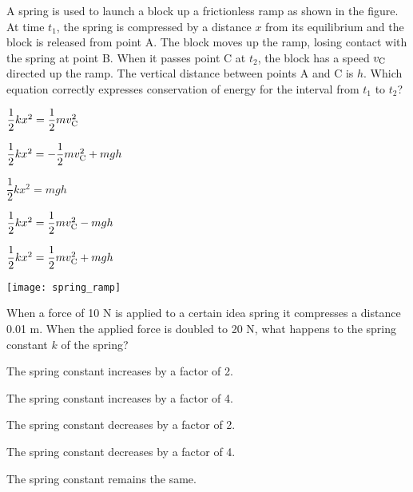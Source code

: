 \documentclass[11pt]{article}
\begin{document}
\begin{enumerate}
\begin{minipage}[t]{.6\lw}
\item A spring is used to launch a block up a frictionless ramp as shown in the figure. At time $t_1$, the spring is compressed by a distance $x$ from its equilibrium and the block is released from point A. The block moves up the ramp, losing contact with the spring at point B. When it passes point C at $t_2$, the block has a speed $v_{\rm C}$ directed up the ramp. The vertical distance between points A and C is $h$. Which equation correctly expresses conservation of energy for the interval from $t_1$ to $t_2$?
\begin{choices}
\item $\dfrac{1}{2}kx^2=\dfrac{1}{2}mv_{\rm C}^2$
\item $\dfrac{1}{2}kx^2=-\dfrac{1}{2}mv_{\rm C}^2+mgh$
\item $\dfrac{1}{2}kx^2=mgh$
\item $\dfrac{1}{2}kx^2=\dfrac{1}{2}mv_{\rm C}^2-mgh$
\item $\dfrac{1}{2}kx^2=\dfrac{1}{2}mv_{\rm C}^2+mgh$
\end{choices}
\end{minipage}\hfill
\begin{minipage}[t]{.35\lw}
\vspace{0in}
\flushright
\texttt{[image: spring\_ramp]}
\end{minipage}

\vspace{.25in}

\item When a force of 10 N is applied to a certain idea spring it compresses a distance 0.01 m. When the applied force is doubled to 20 N, what happens to the spring constant $k$ of the spring?
\begin{choices}
\item The spring constant increases by a factor of 2.
\item The spring constant increases by a factor of 4.
\item The spring constant decreases by a factor of 2.
\item The spring constant decreases by a factor of 4.
\item The spring constant remains the same.
\end{choices}

\newpage


\end{enumerate}
\end{document}
